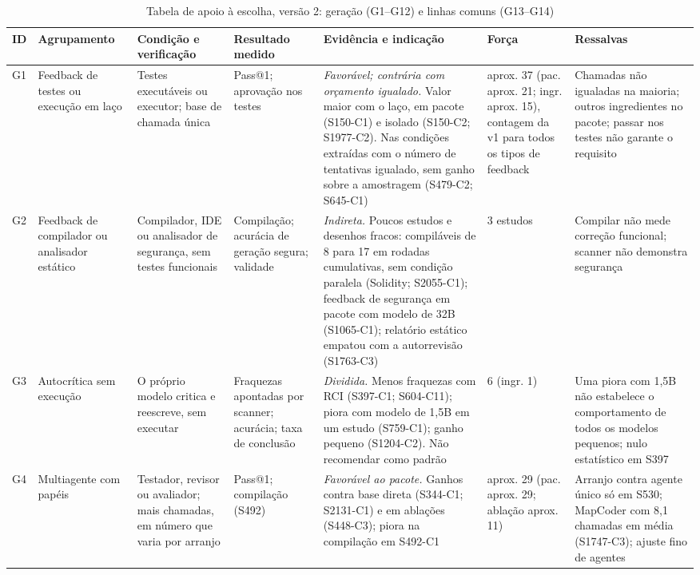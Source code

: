 \providecommand*{\rr}{\raggedright\hspace{0pt}}
\begin{table}[!tp]
\caption{Tabela de apoio à escolha, versão 2: geração (G1--G12) e linhas comuns (G13--G14)}\label{tab:apoio}
\centering
\fontsize{6.6}{7.4}\selectfont
\renewcommand{\arraystretch}{0.95}
\setlength{\tabcolsep}{2.5pt}
\renewcommand*{\rr}{\raggedright\hspace{0pt}}
\begin{tabular}{p{0.55cm}p{2.0cm}p{2.4cm}p{1.9cm}p{5.6cm}p{1.6cm}p{3.1cm}}
\hline
\rr\textbf{ID} & \rr\textbf{Agrupamento} & \rr\textbf{Condição e verificação} & \rr\textbf{Resultado medido} & \rr\textbf{Evidência e indicação} & \rr\textbf{Força} & \rr\textbf{Ressalvas}\tabularnewline
\hline
\rr G1 & \rr Feedback de testes ou execução em laço & \rr Testes executáveis ou executor; base de chamada única & \rr Pass@1; aprovação nos testes & \rr \textit{Favorável; contrária com orçamento igualado.} Valor maior com o laço, em pacote (S150-C1) e isolado (S150-C2; S1977-C2). Nas condições extraídas com o número de tentativas igualado, sem ganho sobre a amostragem (S479-C2; S645-C1) & \rr aprox. 37 (pac. aprox. 21; ingr. aprox. 15), contagem da v1 para todos os tipos de feedback & \rr Chamadas não igualadas na maioria; outros ingredientes no pacote; passar nos testes não garante o requisito\tabularnewline
\rr G2 & \rr Feedback de compilador ou analisador estático & \rr Compilador, IDE ou analisador de segurança, sem testes funcionais & \rr Compilação; acurácia de geração segura; validade & \rr \textit{Indireta.} Poucos estudos e desenhos fracos: compiláveis de 8 para 17 em rodadas cumulativas, sem condição paralela (Solidity; S2055-C1); feedback de segurança em pacote com modelo de 32B (S1065-C1); relatório estático empatou com a autorrevisão (S1763-C3) & \rr 3 estudos & \rr Compilar não mede correção funcional; scanner não demonstra segurança\tabularnewline
\rr G3 & \rr Autocrítica sem execução & \rr O próprio modelo critica e reescreve, sem executar & \rr Fraquezas apontadas por scanner; acurácia; taxa de conclusão & \rr \textit{Dividida.} Menos fraquezas com RCI (S397-C1; S604-C11); piora com modelo de 1,5B em um estudo (S759-C1); ganho pequeno (S1204-C2). Não recomendar como padrão & \rr 6 (ingr. 1) & \rr Uma piora com 1,5B não estabelece o comportamento de todos os modelos pequenos; nulo estatístico em S397\tabularnewline
\rr G4 & \rr Multiagente com papéis & \rr Testador, revisor ou avaliador; mais chamadas, em número que varia por arranjo & \rr Pass@1; compilação (S492) & \rr \textit{Favorável ao pacote.} Ganhos contra base direta (S344-C1; S2131-C1) e em ablações (S448-C3); piora na compilação em S492-C1 & \rr aprox. 29 (pac. aprox. 29; ablação aprox. 11) & \rr Arranjo contra agente único só em S530; MapCoder com 8,1 chamadas em média (S1747-C3); ajuste fino de agentes\tabularnewline

\end{tabular}
\end{table}
